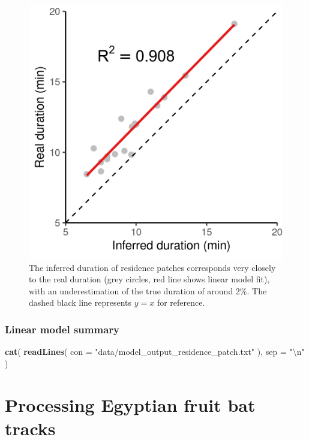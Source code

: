 \documentclass[
]{scrartcl}
\newenvironment{Shaded}{}{}
\newcommand{\CharTok}[1]{\textcolor[rgb]{0.25,0.44,0.63}{#1}}
\newcommand{\DataTypeTok}[1]{\textcolor[rgb]{0.56,0.13,0.00}{#1}}
\newcommand{\KeywordTok}[1]{\textcolor[rgb]{0.00,0.44,0.13}{\textbf{#1}}}
\newcommand{\NormalTok}[1]{#1}
\newcommand{\StringTok}[1]{\textcolor[rgb]{0.25,0.44,0.63}{#1}}
\begin{document}
\begin{figure}
\centering
\includegraphics{figures/fig_calib_lm_duration.png}
\caption{The inferred duration of residence patches corresponds very closely to the real duration (grey circles, red line shows linear model fit), with an underestimation of the true duration of around 2\%. The dashed black line represents \(y = x\) for reference.}
\end{figure}

\hypertarget{linear-model-summary}{%
\subsubsection{Linear model summary}\label{linear-model-summary}}

\begin{Shaded}
\begin{Highlighting}[]
\KeywordTok{cat}\NormalTok{(}
  \KeywordTok{readLines}\NormalTok{(}
    \DataTypeTok{con =} \StringTok{"data/model\_output\_residence\_patch.txt"}
\NormalTok{  ), }\DataTypeTok{sep =} \StringTok{"}\CharTok{\textbackslash{}n}\StringTok{"}
\NormalTok{)}
\end{Highlighting}
\end{Shaded}

\hypertarget{processing-egyptian-fruit-bat-tracks}{%
\section{Processing Egyptian fruit bat tracks}\label{processing-egyptian-fruit-bat-tracks}}
\end{document}
